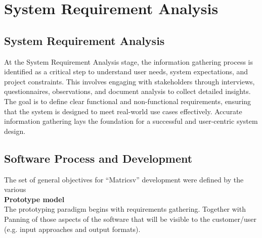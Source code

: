 \chapter{System Requirement Analysis}


\section{System Requirement Analysis}

 At the System Requirement Analysis stage, the information gathering process is identified as a critical step to understand user needs, system expectations, and project constraints. This involves engaging with stakeholders through interviews, questionnaires, observations, and document analysis to collect detailed insights. The goal is to define clear functional and non-functional requirements, ensuring that the system is designed to meet real-world use cases effectively. Accurate information gathering lays the foundation for a successful and user-centric system design.





\section{Software Process and Development}
The set of general objectives for “Matricsv” development were defined by the various \\
\textbf{Prototype model}\\
The prototyping paradigm begins with requirements gathering. Together with Panning of those aspects of the software that will be visible to the customer/user (e.g. input approaches and output formats).

